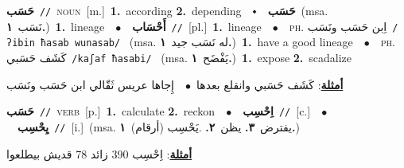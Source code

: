 \documentclass[10pt,a4paper,twoside]{article} %
\begin{document}
\begin{multicols}{2}
{\setlength\topsep{0pt}\textbf{\foreignlanguage{arabic}{حَسَب}}\ {\color{gray}\texttt{//}\color{black}}\ \textsc{noun}\ [m.]\ \textbf{1.}~according  \textbf{2.}~depending\ \ $\smblkdiamond$\ \ \setlength\topsep{0pt}\textbf{\foreignlanguage{arabic}{حَسَب}}\ \color{gray}(msa. \foreignlanguage{arabic}{نَسَب}~\foreignlanguage{arabic}{\textbf{١.}})\color{black}\ \textbf{1.}~lineage\ \ $\bullet$\ \ \setlength\topsep{0pt}\textbf{\foreignlanguage{arabic}{أَحْسَاب}}\ {\color{gray}\texttt{//}\color{black}}\ [pl.]\ \textbf{1.}~lineage\ \ $\bullet$\ \ \textsc{ph.} \color{gray} \foreignlanguage{arabic}{اِبن حَسَب ونَسَب}\color{black}\ {\color{gray}\texttt{/{\sffamily ʔibin ħasab wunasab}/}\color{black}}\ \color{gray} (msa. \foreignlanguage{arabic}{له نَسَب جيد}~\foreignlanguage{arabic}{\textbf{١.}})\color{black}\ \textbf{1.}~have a good lineage\ \ $\bullet$\ \ \textsc{ph.} \color{gray} \foreignlanguage{arabic}{كَشَف حَسَبي}\color{black}\ {\color{gray}\texttt{/{\sffamily kaʃaf ħasabi}/}\color{black}}\ \color{gray} (msa. \foreignlanguage{arabic}{يَفْضَح}~\foreignlanguage{arabic}{\textbf{١.}})\color{black}\ \textbf{1.}~expose  \textbf{2.}~scadalize\  \begin{flushright}\color{gray}\foreignlanguage{arabic}{\textbf{\underline{\foreignlanguage{arabic}{أمثلة}}}: كَشَف حَسَبي وانقلع بعدها\ $\bullet$\ \  إِجاها عريس ثَقّالي ابن حَسَب ونَسَب}\end{flushright}\color{black}} \vspace{2mm}

{\setlength\topsep{0pt}\textbf{\foreignlanguage{arabic}{حَسَب}}\ {\color{gray}\texttt{//}\color{black}}\ \textsc{verb}\ [p.]\ \textbf{1.}~calculate  \textbf{2.}~reckon\ \ $\bullet$\ \ \setlength\topsep{0pt}\textbf{\foreignlanguage{arabic}{اِحْسِب}}\ {\color{gray}\texttt{//}\color{black}}\ [c.]\ \ $\bullet$\ \ \setlength\topsep{0pt}\textbf{\foreignlanguage{arabic}{يِحْسِب}}\ {\color{gray}\texttt{//}\color{black}}\ [i.]\ \color{gray}(msa. \foreignlanguage{arabic}{يفترض}~\foreignlanguage{arabic}{\textbf{٣.}}  \foreignlanguage{arabic}{يظن}~\foreignlanguage{arabic}{\textbf{٢.}}  .\foreignlanguage{arabic}{يَحْسِب (أرقام)}~\foreignlanguage{arabic}{\textbf{١.}})\color{black}\  \begin{flushright}\color{gray}\foreignlanguage{arabic}{\textbf{\underline{\foreignlanguage{arabic}{أمثلة}}}: اِحْسِب 390 زائد 78 قديش بيطلعوا}\end{flushright}\color{black}} \vspace{2mm}


\end{multicols}
\end{document}
